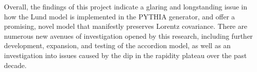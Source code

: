 \documentclass[12pt,a4paper]{report}
\begin{document}
Overall, the findings of this project indicate a glaring and longstanding issue in how the Lund model is implemented in the PYTHIA generator, and offer a promising, novel model that manifestly preserves Lorentz covariance. There are numerous new avenues of investigation opened by this research, including further development, expansion, and testing of the accordion model, as well as an investigation into issues caused by the dip in the rapidity plateau over the past decade.



\end{document}
